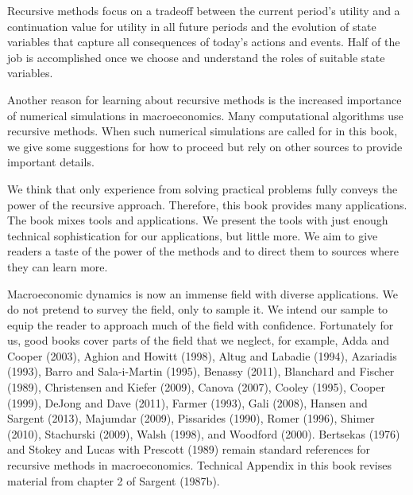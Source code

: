 Recursive methods  focus on a tradeoff between the current period's
utility and a continuation value for utility in all future periods and
the evolution of
state variables that capture all consequences of today's actions and
events.  Half of
the job  is accomplished
once we choose and understand the roles of suitable  state variables.


Another reason for learning about  recursive methods  is
the increased importance of numerical simulations in
macroeconomics. Many computational algorithms use
recursive methods. When such numerical simulations are called for
in this book, we give some suggestions for how to proceed but rely on other sources to
provide important details.



\noindent
We think that only experience from
solving practical problems
fully conveys
the power of  the recursive approach.     Therefore, this book provides
many applications.
 The book mixes tools and   applications.      We  present the tools with just enough technical
sophistication
for our applications, but little more.         We aim
to give readers a taste of the power of the methods and
to direct them to sources where  they can learn more.

  Macroeconomic dynamics is now an immense field with
diverse applications.  We do not pretend to survey the field, only
to sample it.  We intend our sample to equip  the reader to
approach much of the field with confidence. Fortunately for us,
  good  books cover parts of the field
that we neglect, for example, Adda and Cooper (2003), Aghion and Howitt (1998), Altug and Labadie
(1994), Azariadis (1993), Barro and
Sala-i-Martin (1995), Benassy (2011),  Blanchard and Fischer (1989),  Christensen and  Kiefer (2009), Canova (2007), Cooley (1995),  Cooper (1999),
DeJong and Dave (2011), Farmer (1993),  Gali (2008), Hansen and Sargent (2013),
Majumdar (2009), Pissarides (1990),
Romer (1996),  Shimer (2010), Stachurski (2009),  Walsh (1998),
and   Woodford (2000).   Bertsekas (1976) and Stokey and  Lucas with
Prescott (1989)  remain standard references
for recursive methods in macro\-economics. %
Technical  Appendix   in this book revises material
from  chapter 2 of Sargent (1987b). 
    
        



